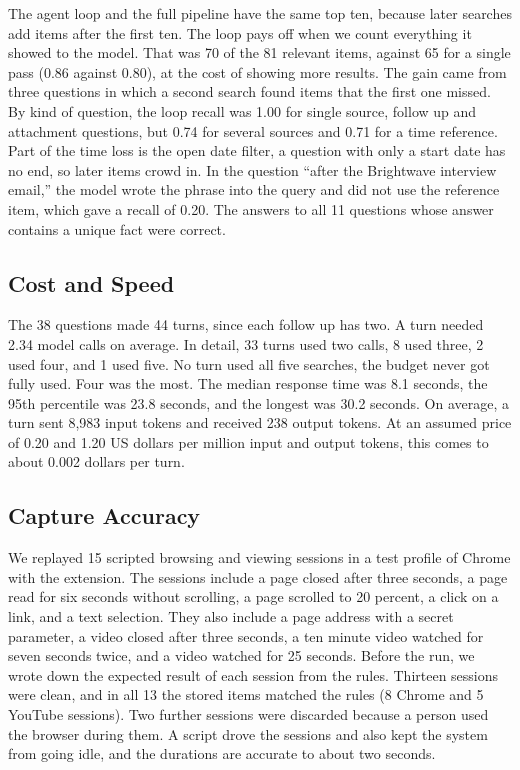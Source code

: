 \documentclass[conference]{IEEEtran}
\begin{document}
The agent loop and the full pipeline have the same top ten, because later searches add items after the first ten. The loop pays off when we count everything it showed to the model. That was 70 of the 81 relevant items, against 65 for a single pass (0.86 against 0.80), at the cost of showing more results. The gain came from three questions in which a second search found items that the first one missed. By kind of question, the loop recall was 1.00 for single source, follow up and attachment questions, but 0.74 for several sources and 0.71 for a time reference. Part of the time loss is the open date filter, a question with only a start date has no end, so later items crowd in. In the question ``after the Brightwave interview email,'' the model wrote the phrase into the query and did not use the reference item, which gave a recall of 0.20. The answers to all 11 questions whose answer contains a unique fact were correct.

\subsection{Cost and Speed}
The 38 questions made 44 turns, since each follow up has two. A turn needed 2.34 model calls on average. In detail, 33 turns used two calls, 8 used three, 2 used four, and 1 used five. No turn used all five searches, the budget never got fully used. Four was the most. The median response time was 8.1 seconds, the 95th percentile was 23.8 seconds, and the longest was 30.2 seconds. On average, a turn sent 8,983 input tokens and received 238 output tokens. At an assumed price of 0.20 and 1.20 US dollars per million input and output tokens, this comes to about 0.002 dollars per turn.

\subsection{Capture Accuracy}
We replayed 15 scripted browsing and viewing sessions in a test profile of Chrome with the extension. The sessions include a page closed after three seconds, a page read for six seconds without scrolling, a page scrolled to 20 percent, a click on a link, and a text selection. They also include a page address with a secret parameter, a video closed after three seconds, a ten minute video watched for seven seconds twice, and a video watched for 25 seconds. Before the run, we wrote down the expected result of each session from the rules. Thirteen sessions were clean, and in all 13 the stored items matched the rules (8 Chrome and 5 YouTube sessions). Two further sessions were discarded because a person used the browser during them. A script drove the sessions and also kept the system from going idle, and the durations are accurate to about two seconds.
\end{document}
